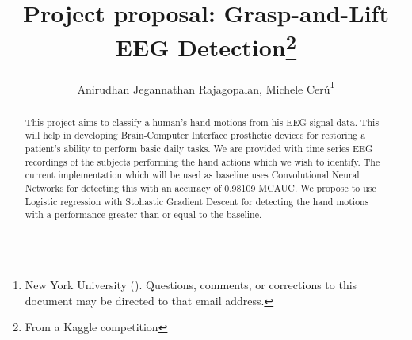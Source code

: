\documentclass[final,leqno,onefignum,onetabnum]{siamltexmm}
\title{Project proposal: Grasp-and-Lift EEG Detection\thanks{From a Kaggle competition}}
\author{Anirudhan Jegannathan Rajagopalan, Michele Cer\'u\thanks{New York University (\email{anirudhan.jegannathan@nyu.edu; mc3784@nyu.edu}). Questions, comments, or corrections
to this document may be directed to that email address.}}
\begin{document}
\maketitle
\newcommand{\slugmaster}{%
\slugger{siads}{xxxx}{xx}{x}{x---x}}%

  \begin{abstract}
    This project aims to classify a human's hand motions from his EEG signal data.  This will help in developing Brain-Computer Interface prosthetic devices for restoring a patient's ability to perform basic daily tasks.
    We are provided with time series EEG recordings of the subjects performing the hand actions which we wish to identify.
    The current implementation which will be used as baseline uses Convolutional Neural Networks for detecting this with an accuracy of 0.98109 MCAUC\@.  
    We propose to use Logistic regression with Stohastic Gradient Descent for detecting the hand motions with a performance greater than or equal to the baseline.
  \end{abstract}

  \pagestyle{myheadings}
  \thispagestyle{plain}
\end{document}
